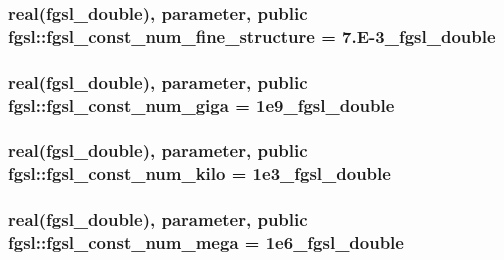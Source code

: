 \hypertarget{classfgsl_aa12fc22d559b707d7e1e63ac17c596cb}{
\subsubsection[{fgsl\-\_\-const\-\_\-num\-\_\-fine\-\_\-structure}]{\setlength{\rightskip}{0pt plus 5cm}real({\bf fgsl\-\_\-double}), parameter, public fgsl\-::fgsl\-\_\-const\-\_\-num\-\_\-fine\-\_\-structure = 7.\-E-\/3\-\_\-fgsl\-\_\-double}}\label{classfgsl_aa12fc22d559b707d7e1e63ac17c596cb}
\hypertarget{classfgsl_a27758acec15033cf3c0918d8d9c55eca}{
\subsubsection[{fgsl\-\_\-const\-\_\-num\-\_\-giga}]{\setlength{\rightskip}{0pt plus 5cm}real({\bf fgsl\-\_\-double}), parameter, public fgsl\-::fgsl\-\_\-const\-\_\-num\-\_\-giga = 1e9\-\_\-fgsl\-\_\-double}}\label{classfgsl_a27758acec15033cf3c0918d8d9c55eca}
\hypertarget{classfgsl_a921e5869ad16238cb472943f2486d0ac}{
\subsubsection[{fgsl\-\_\-const\-\_\-num\-\_\-kilo}]{\setlength{\rightskip}{0pt plus 5cm}real({\bf fgsl\-\_\-double}), parameter, public fgsl\-::fgsl\-\_\-const\-\_\-num\-\_\-kilo = 1e3\-\_\-fgsl\-\_\-double}}\label{classfgsl_a921e5869ad16238cb472943f2486d0ac}
\hypertarget{classfgsl_a3783a70eb7db5888129ccf2094415129}{
\subsubsection[{fgsl\-\_\-const\-\_\-num\-\_\-mega}]{\setlength{\rightskip}{0pt plus 5cm}real({\bf fgsl\-\_\-double}), parameter, public fgsl\-::fgsl\-\_\-const\-\_\-num\-\_\-mega = 1e6\-\_\-fgsl\-\_\-double}}\label{classfgsl_a3783a70eb7db5888129ccf2094415129}
